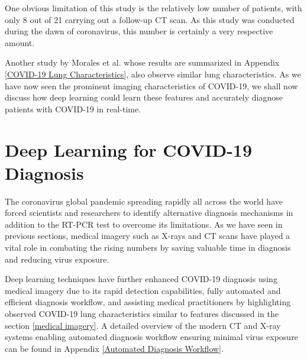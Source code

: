
\vspace{-2em}
One obvious limitation of this study is the relatively low number of 
patients, with only 8 out of 21 carrying out a follow-up CT scan. As this study
was conducted during the dawn of coronavirus, this number is certainly a 
very respective amount.

Another study by Morales et al. whose results are summarized in Appendix \ref{COVID-19 Lung Characteristics}, also observe similar lung characteristics. As we have now seen the prominent imaging characteristics of 
COVID-19, we shall now discuss how deep learning could learn these 
features and accurately diagnose patients with COVID-19 in real-time. 

\section{Deep Learning for COVID-19 Diagnosis}

The coronavirus global pandemic spreading rapidly all across the world have 
forced scientists and researchers to identify alternative 
diagnosis mechanisms in addition to the RT-PCR test to overcome 
its limitations. As we have seen in previous sections, 
medical imagery such as X-rays and CT scans have played a 
vital role in combating the rising numbers by saving 
valuable time in diagnosis and reducing virus exposure.

Deep learning techniques have further enhanced COVID-19 diagnosis 
using medical imagery due to its rapid detection capabilities, 
fully automated and efficient diagnosis workflow, 
and assisting medical practitioners by highlighting observed 
COVID-19 lung characteristics similar to 
features discussed in the section \ref{medical imagery}. A detailed overview of the modern CT and X-ray systems enabling automated diagnosis workflow ensuring minimal virus exposure can be found in Appendix \ref{Automated Diagnosis Workflow}.

